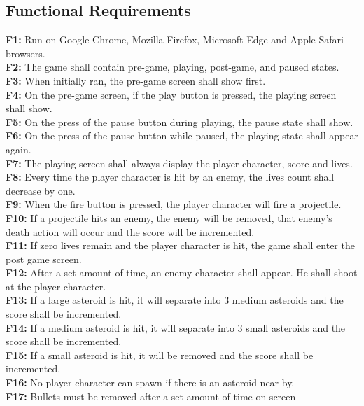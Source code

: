 \documentclass[12pt, titlepage]{article}
\begin{document}
\subsection{Functional Requirements}
  \begin{enumerate}
    \textbf{F1:} Run on Google Chrome, Mozilla Firefox, Microsoft Edge and Apple Safari browsers.\\
    \textbf{F2:} The game shall contain pre-game, playing, post-game, and paused states.\\
    \textbf{F3:} When initially ran, the pre-game screen shall show first.\\
    \textbf{F4:} On the pre-game screen, if the play button is pressed, the playing screen shall show.\\
    \textbf{F5:} On the press of the pause button during playing, the pause state shall show.\\
    \textbf{F6:} On the press of the pause button while paused, the playing state shall appear again.\\
    \textbf{F7:} The playing screen shall always display the player character, score and lives.\\
    \textbf{F8:} Every time the player character is hit by an enemy, the lives count shall decrease by one.\\
    \textbf{F9:} When the fire button is pressed, the player character will fire a projectile.\\
    \textbf{F10:} If a projectile hits an enemy, the enemy will be removed, that enemy's death action will occur and the score will be incremented.\\
    \textbf{F11:} If zero lives remain and the player character is hit, the game shall enter the post game screen.\\
    \textbf{F12:} After a set amount of time, an enemy character shall appear. He shall shoot at the player character.\\
    \textbf{F13:} If a large asteroid is hit, it will separate into 3 medium asteroids and the score shall be incremented.\\
    \textbf{F14:} If a medium asteroid is hit, it will separate into 3 small asteroids and the score shall be incremented.\\
    \textbf{F15:} If a small asteroid is hit, it will be removed and the score shall be incremented.\\
    \textbf{F16:} No player character can spawn if there is an asteroid near by.\\
    \textbf{F17:} Bullets must be removed after a set amount of time on screen\\

\end{enumerate}
\end{document}
